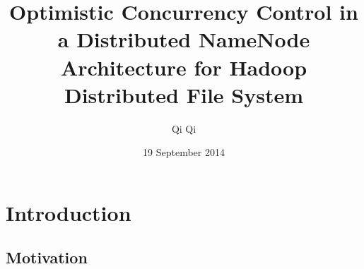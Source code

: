 \documentclass{beamer}
\title[OCC for Hops-HDFS]{Optimistic Concurrency Control in a Distributed NameNode Architecture for Hadoop Distributed File System} %
\author{Qi Qi} %
\institute[IST/KTH/SICS] %
{
Instituto Superior T\'{e}cnico - IST (Portugal) \\ Royal Institute of Technology - KTH (Sweden) \\ 
Swedish Institute of Computer Science - SICS (Sweden) \\%
\medskip
\textit{qiq@kth.se} %
}
\date{19 September 2014} %
\begin{document}
\begin{frame}
\titlepage %
\end{frame}



\section{Introduction} %

\subsection{Motivation} %
\end{document}
